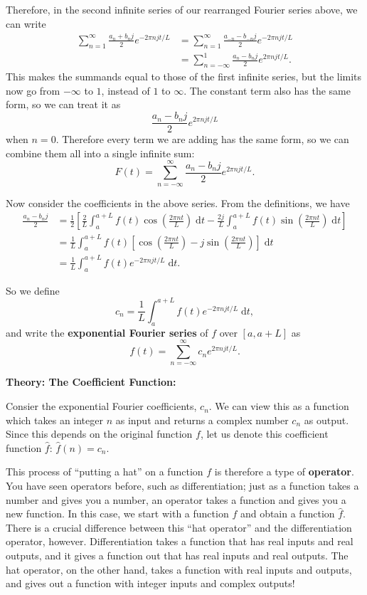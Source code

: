 \documentclass{article}
\newcommand{\diff}{\;\mathrm{d}}
\begin{document}
Therefore, in the second infinite series of our rearranged Fourier series above, we can write
\begin{align*}
	\sum_{n=1}^\infty \frac{a_n+b_nj}{2}e^{-2\pi njt/L}&=\sum_{n=1}^\infty \frac{a_{-n}-b_{-n}j}{2}e^{-2\pi njt/L}\\
	&= \sum_{n=-\infty}^1 \frac{a_n-b_nj}{2}e^{2\pi njt/L}.
\end{align*}
This makes the summands equal to those of the first infinite series, but the limits now go from $-\infty$ to $1$, instead of $1$ to $\infty$. The constant term also has the same form, so we can treat it as
\[\frac{a_n-b_nj}{2}e^{2\pi njt/L}\]
when $n=0$. Therefore every term we are adding has the same form, so we can combine them all into a single infinite sum:
\[F(t)=\sum_{n=-\infty}^\infty \frac{a_n-b_nj}{2}e^{2\pi njt/L}.\]\medskip


Now consider the coefficients in the above series. From the definitions, we have
\begin{align*}
	\frac{a_n-b_nj}{2} &= \frac{1}{2}\left[\frac{2}{L}\int_a^{a+L}\!\!f(t)\cos\left(\frac{2\pi nt}{L}\right)\diff t -\frac{2j}{L}\int_a^{a+L}\!\! f(t)\sin\left(\frac{2\pi nt}{L}\right)\diff t\right]\\
	&=\frac{1}{L}\int_a^{a+L}\!\!f(t)\left[\cos\left(\frac{2\pi nt}{L}\right) - j \sin\left(\frac{2\pi nt}{L}\right)\right]\diff t\\
	&=\frac{1}{L}\int_a^{a+L}\!\! f(t)e^{-2\pi njt/L}\diff t.
\end{align*}

So we define
\[c_n=\frac{1}{L}\int_a^{a+L}\!\!f(t)e^{-2\pi njt/L}\diff t,\]
and write the \textbf{exponential Fourier series} of $f$ over $[a,a+L]$ as
\[f(t)=\sum_{n=-\infty}^\infty c_n e^{2\pi njt/L}.\]




\clearpage












\textbf{Theory: The Coefficient Function:}\bigskip


Consier the exponential Fourier coefficients, $c_n$. We can view this as a function which takes an integer $n$ as input and returns a complex number $c_n$ as output. Since this depends on the original function $f$, let us denote this coefficient function $\hat{f}$: $\hat{f}(n)=c_n$.

This process of ``putting a hat'' on a function $f$ is therefore a type of \textbf{operator}. You have seen operators before, such as differentiation; just as a function takes a number and gives you a number, an operator takes a function and gives you a new function. In this case, we start with a function $f$ and obtain a function $\hat{f}$. There is a crucial difference between this ``hat operator'' and the differentiation operator, however. Differentiation takes a function that has real inputs and real outputs, and it gives a function out that has real inputs and real outputs. The hat operator, on the other hand, takes a function with real inputs and outputs, and gives out a function with integer inputs and complex outputs!
\end{document}

